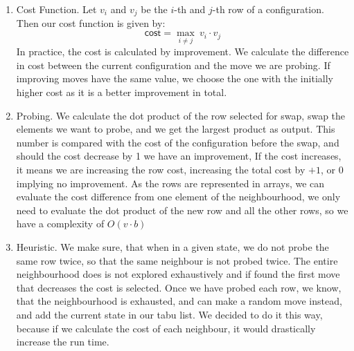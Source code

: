 \begin{enumerate}
\item Cost Function. Let $v_i$ and $v_j$ be the $i$-th and $j$-th row of a configuration. Then our cost function is given by: 
\begin{equation*}
 \mathsf{cost} = \max_{i \neq j}\: v_i \cdot v_j 
\end{equation*}
In practice, the cost is  calculated by improvement. We calculate the difference in cost between the current configuration and the move we are probing. If improving moves have the same value, we choose the one with the initially higher cost as it is a better improvement in total. 
\item Probing.  
We calculate the dot product of the row selected for swap, swap the elements we want to probe, and we get the largest product as output. This number is compared with the cost of the configuration before the swap, and should the cost decrease by 1 we have an improvement, If the cost increases, it means we are increasing the row cost, increasing the total cost by $+1$, or $0$ implying no improvement. 
As the rows are represented in arrays, we can evaluate the cost difference from one element of the neighbourhood, we only need to evaluate the dot product of the new row and all the other rows, so we have a complexity of $O(v \cdot b)$
\item Heuristic. We make sure, that when in a given state, we do not probe the same row twice, so that the same neighbour is not probed twice. The entire neighbourhood does is not explored exhaustively and if found the first move that decreases the cost is selected. Once we have probed each row, we know, that the neighbourhood is exhausted, and can make a random move instead, and add the current state in our tabu list. We decided to do it this way, because if we calculate the cost of each neighbour, it would drastically increase the run time. 

\end{enumerate}
